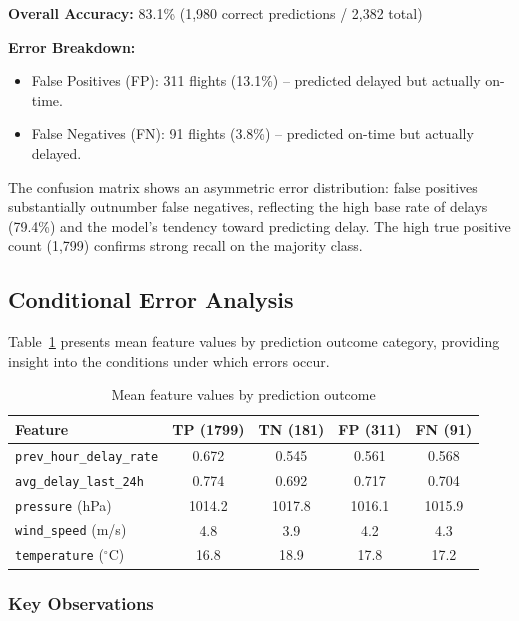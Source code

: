 \documentclass{report}
\begin{document}
\textbf{Overall Accuracy:} 83.1\% (1,980 correct predictions / 2,382 total)

\textbf{Error Breakdown:}
\begin{itemize}
\item False Positives (FP): 311 flights (13.1\%) -- predicted delayed but
  actually on-time.
\item False Negatives (FN): 91 flights (3.8\%) -- predicted on-time but
  actually delayed.
\end{itemize}

The confusion matrix shows an asymmetric error distribution: false positives
substantially outnumber false negatives, reflecting the high base rate of
delays (79.4\%) and the model's tendency toward predicting delay.  The high
true positive count (1,799) confirms strong recall on the majority class.

\subsection{Conditional Error Analysis}

Table~\ref{tab:cond_error} presents mean feature values by prediction
outcome category, providing insight into the conditions under which errors
occur.

\begin{table}[H]
\centering
\caption{Mean feature values by prediction outcome}
\label{tab:cond_error}
\begin{tabular}{lcccc}
\toprule
\textbf{Feature} & \textbf{TP (1799)} & \textbf{TN (181)} &
  \textbf{FP (311)} & \textbf{FN (91)} \\
\midrule
\texttt{prev\_hour\_delay\_rate} & 0.672 & 0.545 & 0.561 & 0.568 \\
\texttt{avg\_delay\_last\_24h}   & 0.774 & 0.692 & 0.717 & 0.704 \\
\texttt{pressure} (hPa)          & 1014.2 & 1017.8 & 1016.1 & 1015.9 \\
\texttt{wind\_speed} (m/s)       & 4.8 & 3.9 & 4.2 & 4.3 \\
\texttt{temperature} ($^\circ$C) & 16.8 & 18.9 & 17.8 & 17.2 \\
\bottomrule
\end{tabular}
\end{table}

\subsubsection*{Key Observations}
\end{document}
